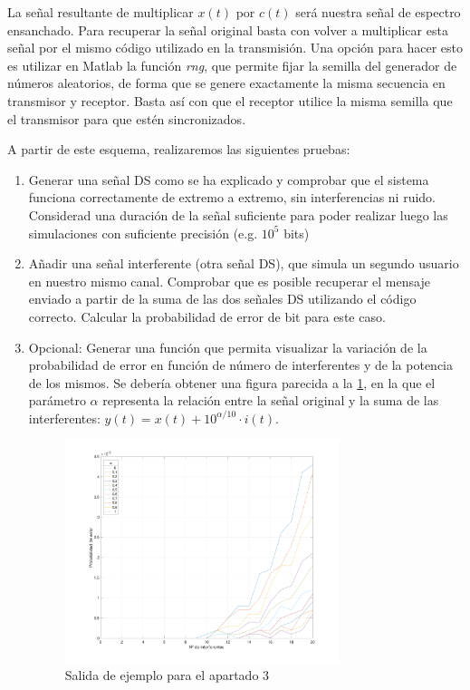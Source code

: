 \documentclass[es,practica]{uah}
\begin{document}
La señal resultante de multiplicar $x(t)$ por $c(t)$ será nuestra señal de espectro ensanchado. Para recuperar la señal original basta con volver a multiplicar esta señal por el mismo código utilizado en la transmisión. Una opción para hacer esto es utilizar en Matlab la función \emph{rng}, que permite fijar la semilla del generador de números aleatorios, de forma que se genere exactamente la misma secuencia en transmisor y receptor. Basta así con que el receptor utilice la misma semilla que el transmisor para que estén sincronizados. 

A partir de este esquema, realizaremos las siguientes pruebas:

\begin{enumerate}
	\item Generar una señal DS como se ha explicado y comprobar que el sistema funciona correctamente de extremo a extremo, sin interferencias ni ruido. Considerad una duración de la señal suficiente para poder realizar luego las simulaciones con suficiente precisión (e.g. $10^5$ bits)
	\item Añadir una señal interferente (otra señal DS), que simula un segundo usuario en nuestro mismo canal. Comprobar que es posible recuperar el mensaje enviado a partir de la suma de las dos señales DS utilizando el código correcto. Calcular la probabilidad de error de bit para este caso. 
	\item Opcional: Generar una función que permita visualizar la variación de la probabilidad de error en función de número de interferentes y de la potencia de los mismos. Se debería obtener una figura parecida a la \ref{fig:figura1}, en la que el parámetro $\alpha$ representa la relación entre la señal original y la suma de las interferentes: $y(t) = x(t) + 10^{\alpha/10}\cdot i(t)$.
	

	\begin{figure}[h!]
		\centering\includegraphics[width=8cm]{../Apuntes/Figuras/Figura1}
		\caption{Salida de ejemplo para el apartado 3}
		\label{fig:figura1}
	\end{figure}



\end{enumerate}
\end{document}

